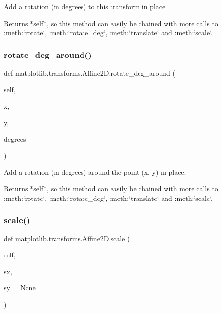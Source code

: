 \begin{DoxyVerb}Add a rotation (in degrees) to this transform in place.

Returns *self*, so this method can easily be chained with more
calls to :meth:`rotate`, :meth:`rotate_deg`, :meth:`translate`
and :meth:`scale`.
\end{DoxyVerb}
 \mbox{\label{classmatplotlib_1_1transforms_1_1Affine2D_a924675f12ef956d1baca7cf870dc0e71}} 
\subsubsection{\texorpdfstring{rotate\+\_\+deg\+\_\+around()}{rotate\_deg\_around()}}
{\footnotesize\ttfamily def matplotlib.\+transforms.\+Affine2\+D.\+rotate\+\_\+deg\+\_\+around (\begin{DoxyParamCaption}\item[{}]{self,  }\item[{}]{x,  }\item[{}]{y,  }\item[{}]{degrees }\end{DoxyParamCaption})}

\begin{DoxyVerb}Add a rotation (in degrees) around the point (x, y) in place.

Returns *self*, so this method can easily be chained with more
calls to :meth:`rotate`, :meth:`rotate_deg`, :meth:`translate`
and :meth:`scale`.
\end{DoxyVerb}
 \mbox{\label{classmatplotlib_1_1transforms_1_1Affine2D_ace725f95dffce8d38ca3ed69faca2d9a}} 
\subsubsection{\texorpdfstring{scale()}{scale()}}
{\footnotesize\ttfamily def matplotlib.\+transforms.\+Affine2\+D.\+scale (\begin{DoxyParamCaption}\item[{}]{self,  }\item[{}]{sx,  }\item[{}]{sy = {\ttfamily None} }\end{DoxyParamCaption})}

